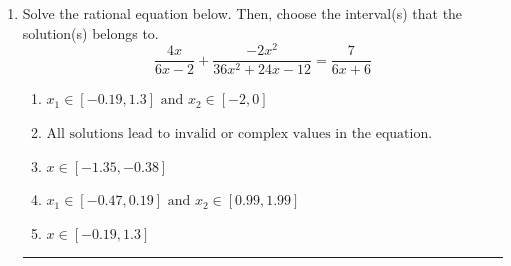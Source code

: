 \documentclass[14pt]{extbook}
\newcommand{\litem}[1]{\item#1\hspace*{-1cm}\rule{\textwidth}{0.4pt}}
\begin{document}
\begin{enumerate}
{\begin{enumerate}[label=\Alph*.]
\end{enumerate} }
\litem{
Solve the rational equation below. Then, choose the interval(s) that the solution(s) belongs to.\[ \frac{4x}{6x -2} + \frac{-2x^{2}}{36x^{2} +24 x -12} = \frac{7}{6x + 6} \]\begin{enumerate}[label=\Alph*.]
\item \( x_1 \in [-0.19, 1.3] \text{ and } x_2 \in [-2,0] \)
\item \( \text{All solutions lead to invalid or complex values in the equation.} \)
\item \( x \in [-1.35,-0.38] \)
\item \( x_1 \in [-0.47, 0.19] \text{ and } x_2 \in [0.99,1.99] \)
\item \( x \in [-0.19,1.3] \)

\end{enumerate} }
\end{enumerate}
\end{document}
